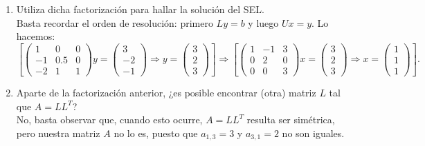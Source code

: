 \documentclass[12pt]{article}
\begin{document}
\begin{ejercicio}
\begin{enumerate}[label=\alph*)]
			
			\item Utiliza dicha factorización para hallar la solución del SEL. \\
			
				Basta recordar el orden de resolución: primero $L y = b$ y luego $U x = y$. Lo hacemos:
				$$\left[ \begin{pmatrix}
					1 & 0 & 0 \\
					-1 & 0.5 & 0 \\
					-2 & 1 & 1
				\end{pmatrix}
				y =
				\begin{pmatrix}
					3 \\
					-2 \\
					-1
				\end{pmatrix}
				\Rightarrow
				y =
				\begin{pmatrix}
					3 \\
					2 \\
					3
				\end{pmatrix} \right] \Rightarrow \left[
				\begin{pmatrix}
					1 & -1 & 3 \\
					0 & 2 & 0 \\
					0 & 0 & 3
				\end{pmatrix}
				x =
				\begin{pmatrix}
					3 \\
					2 \\
					3
				\end{pmatrix}
				\Rightarrow
				x =
				\begin{pmatrix}
					1 \\
					1 \\
					1
				\end{pmatrix} \right].$$
				
			
			\item Aparte de la factorización anterior, ¿es posible encontrar (otra) matriz $L$ tal que $A = L L^T$? \\
			
				No, basta observar que, cuando esto ocurre, $A = L L^T$ resulta ser simétrica, pero nuestra matriz $A$ no
				lo es, puesto que $a_{1,3} = 3$ y $a_{3,1} = 2$ no son iguales.
		\end{enumerate}
	\end{ejercicio}
	
\end{document}
